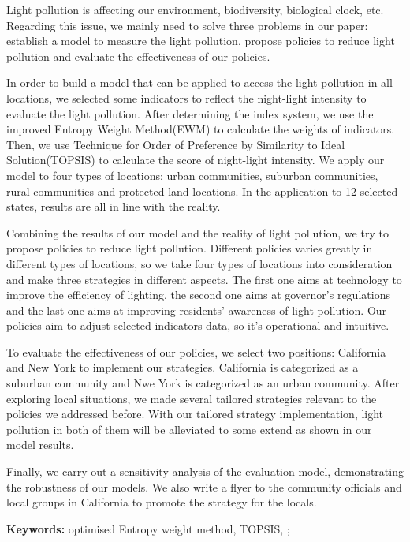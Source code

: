 \MinParskip{}

Light pollution is affecting our environment, biodiversity, biological clock, etc. Regarding this issue, we mainly need to solve three problems in our paper: establish a model to measure the light pollution, propose policies to reduce light pollution and evaluate the effectiveness of our policies.

In order to build a model that can be applied to access the light pollution in all locations, we selected some indicators to reflect the night-light intensity to evaluate the light pollution. After determining the index system, we use the improved Entropy Weight Method(EWM) to calculate the weights of indicators. Then, we use Technique for Order of Preference by Similarity to Ideal Solution(TOPSIS) to calculate the score of night-light intensity. We apply our model to four types of locations: urban communities, suburban communities, rural communities and protected land locations. In the application to 12 selected states, results are all in line with the reality.

Combining the results of our model and the reality of light pollution, we try to propose policies to reduce light pollution. Different policies varies greatly in different types of locations, so we take four types of locations into consideration and make three strategies in different aspects. The first one aims at technology to improve the efficiency of lighting, the second one aims at governor's regulations and the last one aims at improving residents' awareness of light pollution. Our policies aim to adjust selected indicators data, so it's operational and intuitive.

To evaluate the effectiveness of our policies, we select two positions: California and New York to implement our strategies. California is categorized as a suburban community and Nwe York is categorized as an urban community. After exploring local situations, we made several tailored strategies relevant to the policies we addressed before. With our tailored strategy implementation, light pollution in both of them will be alleviated to some extend as shown in our model results.

Finally, we carry out a sensitivity analysis of the evaluation model, demonstrating the robustness of our models. We also write a flyer to the community officials and local groups in California to promote the strategy for the locals.



\textbf{Keywords:} optimised Entropy weight method, TOPSIS, ; 